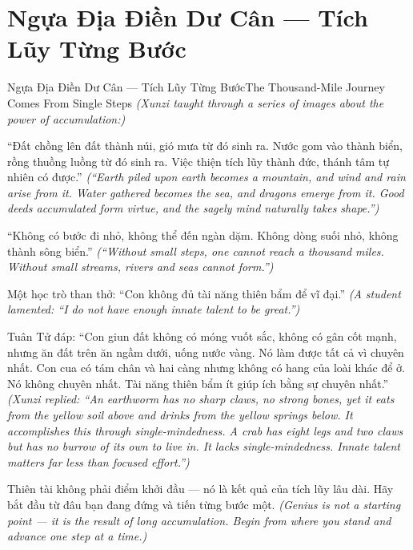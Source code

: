 \section{Ngựa Địa Điền Dư Cân — Tích Lũy Từng Bước}
\begin{truyen}{Ngựa Địa Điền Dư Cân — Tích Lũy Từng Bước}{The Thousand-Mile Journey Comes From Single Steps}
\textit{(Xunzi taught through a series of images about the power of accumulation:)}

``Đất chồng lên đất thành núi, gió mưa từ đó sinh ra. Nước gom vào thành biển, rồng thuồng luồng từ đó sinh ra. Việc thiện tích lũy thành đức, thánh tâm tự nhiên có được.''
\textit{(``Earth piled upon earth becomes a mountain, and wind and rain arise from it. Water gathered becomes the sea, and dragons emerge from it. Good deeds accumulated form virtue, and the sagely mind naturally takes shape.'')}

``Không có bước đi nhỏ, không thể đến ngàn dặm. Không dòng suối nhỏ, không thành sông biển.''
\textit{(``Without small steps, one cannot reach a thousand miles. Without small streams, rivers and seas cannot form.'')}

Một học trò than thở: ``Con không đủ tài năng thiên bẩm để vĩ đại.''
\textit{(A student lamented: ``I do not have enough innate talent to be great.'')}

Tuân Tử đáp: ``Con giun đất không có móng vuốt sắc, không có gân cốt mạnh, nhưng ăn đất trên ăn ngầm dưới, uống nước vàng. Nó làm được tất cả vì chuyên nhất. Con cua có tám chân và hai càng nhưng không có hang của loài khác để ở. Nó không chuyên nhất. Tài năng thiên bẩm ít giúp ích bằng sự chuyên nhất.''
\textit{(Xunzi replied: ``An earthworm has no sharp claws, no strong bones, yet it eats from the yellow soil above and drinks from the yellow springs below. It accomplishes this through single-mindedness. A crab has eight legs and two claws but has no burrow of its own to live in. It lacks single-mindedness. Innate talent matters far less than focused effort.'')}

\end{truyen}

\begin{baihoc}
Thiên tài không phải điểm khởi đầu — nó là kết quả của tích lũy lâu dài. Hãy bắt đầu từ đâu bạn đang đứng và tiến từng bước một.
\textit{(Genius is not a starting point — it is the result of long accumulation. Begin from where you stand and advance one step at a time.)}
\end{baihoc}
\ngancach

